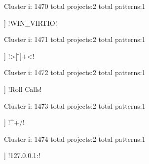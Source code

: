 Cluster i: 1470
total projects:2
total patterns:1
\begin{multicols}{1}
\begin{description}[noitemsep,topsep=0pt]
\item [[2] ] \cverb!WIN_VIRTIO!
\end{description}
\end{multicols}







Cluster i: 1471
total projects:2
total patterns:1
\begin{multicols}{1}
\begin{description}[noitemsep,topsep=0pt]
\item [[2] ] \cverb!>[ \r\n]+<!
\end{description}
\end{multicols}







Cluster i: 1472
total projects:2
total patterns:1
\begin{multicols}{1}
\begin{description}[noitemsep,topsep=0pt]
\item [[2] ] \cverb!Roll Calls!
\end{description}
\end{multicols}







Cluster i: 1473
total projects:2
total patterns:1
\begin{multicols}{1}
\begin{description}[noitemsep,topsep=0pt]
\item [[2] ] \cverb!^\s*\*+/!
\end{description}
\end{multicols}







Cluster i: 1474
total projects:2
total patterns:1
\begin{multicols}{1}
\begin{description}[noitemsep,topsep=0pt]
\item [[2] ] \cverb!127.0.0.1:!
\end{description}
\end{multicols}







